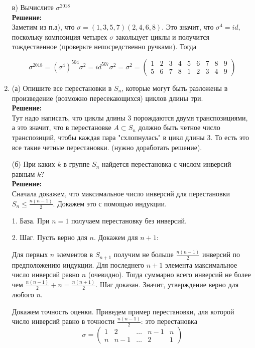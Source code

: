 \documentclass[]{book}
\theoremstyle{definition}
\renewcommand{\leq}{\leqslant}
\begin{document}
\begin{enumerate}[resume]
в) Вычислите $\sigma^{2018}$\\
\textbf{Решение:}\\
Заметим из п.а), что $\sigma = (1, 3, 5, 7)(2, 4, 6, 8)$. Это значит, что $\sigma^4 = id$, поскольку композиция четырех $\sigma$ закольцует циклы и получится тождественное (проверьте непосредственно ручками). Тогда

$$\sigma^{2018} = (\sigma^{4})^{504}\sigma^2 = id^{507}\sigma^2 = \sigma^2 = \begin{pmatrix} 
1 & 2 & 3 & 4 & 5 & 6 & 7 & 8 & 9 \\
5 & 6 & 7 & 8 & 1 & 2 & 3 & 4 & 9
\end{pmatrix}
$$



\item (а) Опишите все перестановки в $S_n$, которые могут быть разложены в произведение (возможно пересекающихся) циклов длины три.\\
\textbf{Решение:}\\
Тут надо написать, что циклы длины 3 порождаются двумя транспозициями, а это значит, что в перестановке $A \subset S_n$ должно быть четное число транспозиций, чтобы каждая пара "схлопнулась" в цикл длины 3. То есть это все такие четные перестановки. (нужно доработать решение).

(б) При каких $k$ в группе $S_n$ найдется перестановка с числом инверсий равным $k$?\\
\textbf{Решение:}\\
Сначала докажем, что максимальное число инверсий для перестановки $S_n \leq \frac{n(n-1)}{2}$. Докажем это с помощью индукции.

1. База. При $n = 1$ получаем перестановку без инверсий.

2. Шаг. Пусть верно для $n$. Докажем для $n+1$:

Для первых $n$ элементов в $S_{n+1}$ получим не больше $\frac{n(n-1)}{2}$ инверсий по предположению индукции. Для последнего $n+1$ элемента максимальное число инверсий равно $n$ (очевидно). Тогда суммарно всего инверсий не более чем $\frac{n(n-1)}{2} + n = \frac{n(n+1)}{2}$. Шаг доказан. Значит, утверждение верно для любого $n$.

Докажем точность оценки. Приведем пример перестановки, для которой число инверсий равно в точности $\frac{n(n-1)}{2}$: это перестановка 
$$
\sigma =
\begin{pmatrix} 
1 & 2   & \ldots & n -1 & n\\
n & n-1 & \ldots & 2    & 1
\end{pmatrix}
$$


\end{enumerate}
\end{document}
